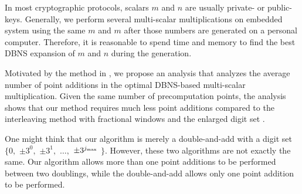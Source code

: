 In most cryptographic protocols, scalars $m$ and $n$ are usually private- or public-keys.
Generally, we perform several multi-scalar multiplications on embedded system using the same $m$ and $m$ after those numbers are generated on a personal computer.
Therefore, it is reasonable to spend time and memory to find the best DBNS expansion of $m$ and $n$ during the generation.

Motivated by the method in \cite{analysisMethod},
we propose an analysis that analyzes the average number of point additions in the optimal DBNS-based multi-scalar multiplication.
Given the same number of precomputation points, the analysis shows that our method requires much less point additions compared to
the interleaving method with fractional windows \cite{fractional} and the enlarged digit set \cite{analysisMethod}.

One might think that our algorithm is merely a double-and-add with a digit set $\{0,$ $\pm 3^0,$ $\pm 3^1,$ $\dots,$ $\pm 3^{j_{\rm max}}$ $\}$.
However, these two algorithms are not exactly the same.
Our algorithm allows more than one point additions to be performed between two doublings,
while the double-and-add allows only one point addition to be performed.
